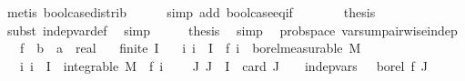 \begin{isabellebody}
\ {\isacharparenleft}{\kern0pt}metis\ bool{\isachardot}{\kern0pt}case{\isacharunderscore}{\kern0pt}distrib{\isacharparenright}{\kern0pt}\isanewline
\ \ \ \ \isamarkupfalse%
\ {\isacharparenleft}{\kern0pt}simp\ add{\isacharcolon}{\kern0pt}\ bool{\isachardot}{\kern0pt}case{\isacharunderscore}{\kern0pt}eq{\isacharunderscore}{\kern0pt}if{\isacharparenright}{\kern0pt}\isanewline
\ \ \isamarkupfalse%
\ \isamarkupfalse%
\ {\isachardoublequoteopen}{\isachardot}{\kern0pt}{\isachardot}{\kern0pt}{\isachardot}{\kern0pt}\ {\isacharequal}{\kern0pt}\ {\isacharquery}{\kern0pt}thesis{\isachardoublequoteclose}\isanewline
\ \ \ \ \isamarkupfalse%
\ {\isacharparenleft}{\kern0pt}subst\ indep{\isacharunderscore}{\kern0pt}var{\isacharunderscore}{\kern0pt}def{\isacharparenright}{\kern0pt}\ \isamarkupfalse%
\ simp\isanewline
\ \ \isamarkupfalse%
\ \isamarkupfalse%
\ {\isacharquery}{\kern0pt}thesis\ \isamarkupfalse%
\ simp\isanewline
{}\isamarkupfalse%
%
\endisatagproof
{\isafoldproof}%
%
\isadelimproof
\isanewline
%
\endisadelimproof
\isanewline
{}\isamarkupfalse%
\ {\isacharparenleft}{\kern0pt}\ prob{\isacharunderscore}{\kern0pt}space{\isacharparenright}{\kern0pt}\ var{\isacharunderscore}{\kern0pt}sum{\isacharunderscore}{\kern0pt}pairwise{\isacharunderscore}{\kern0pt}indep{\isacharunderscore}{\kern0pt}{}{\isacharcolon}{\kern0pt}\isanewline
\ \ \ f\ {\isacharcolon}{\kern0pt}{\isacharcolon}{\kern0pt}\ {\isachardoublequoteopen}{\isacharprime}{\kern0pt}b\ {\isasymRightarrow}\ {\isacharprime}{\kern0pt}a\ {\isasymRightarrow}\ real{\isachardoublequoteclose}\isanewline
\ \ \ {\isachardoublequoteopen}finite\ I{\isachardoublequoteclose}\isanewline
\ \ \ {\isachardoublequoteopen}{\isasymAnd}i{\isachardot}{\kern0pt}\ i\ {\isasymin}\ I\ {\isasymLongrightarrow}\ f\ i\ {\isasymin}\ borel{\isacharunderscore}{\kern0pt}measurable\ M{\isachardoublequoteclose}\isanewline
\ \ \ {\isachardoublequoteopen}{\isasymAnd}i{\isachardot}{\kern0pt}\ i\ {\isasymin}\ I\ {\isasymLongrightarrow}\ integrable\ M\ {\isacharparenleft}{\kern0pt}{\isasymlambda}{\isasymomega}{\isachardot}{\kern0pt}\ f\ i\ {\isasymomega}{\isacharcircum}{\kern0pt}{}{\isacharparenright}{\kern0pt}{\isachardoublequoteclose}\isanewline
\ \ \ {\isachardoublequoteopen}{\isasymAnd}J{\isachardot}{\kern0pt}\ J\ {\isasymsubseteq}\ I\ {\isasymLongrightarrow}\ card\ J\ {\isacharequal}{\kern0pt}\ {}\ {\isasymLongrightarrow}\ indep{\isacharunderscore}{\kern0pt}vars\ {\isacharparenleft}{\kern0pt}{\isasymlambda}\ {\isacharunderscore}{\kern0pt}{\isachardot}{\kern0pt}\ borel{\isacharparenright}{\kern0pt}\ f\ J{\isachardoublequoteclose}\isanewline

\end{isabellebody}
